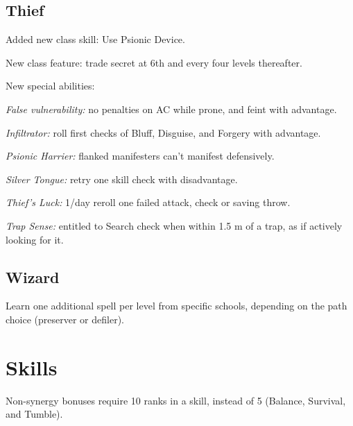 \subsection{Thief}
\begin{itemize*}
\item Added new class skill: Use Psionic Device.
\item New class feature: trade secret at 6th and every four levels thereafter.
\item New special abilities:
	\begin{itemize*}
	\item \textit{False vulnerability:} no penalties on AC while prone, and feint with advantage.
	\item \textit{Infiltrator:} roll first checks of Bluff, Disguise, and Forgery with advantage.
	\item \textit{Psionic Harrier:} flanked manifesters can't manifest defensively.
	\item \textit{Silver Tongue:} retry one skill check with disadvantage.
	\item \textit{Thief's Luck:} 1/day reroll one failed attack, check or saving throw.
	\item \textit{Trap Sense:} entitled to Search check when within 1.5 m of a trap, as if actively looking for it.
	\end{itemize*}
\end{itemize*}

\subsection{Wizard}
\begin{itemize*}
\item Learn one additional spell per level from specific schools, depending on the path choice (preserver or defiler).
\end{itemize*}

\section{Skills}
Non-synergy bonuses require 10 ranks in a skill, instead of 5 (Balance, Survival, and Tumble).


